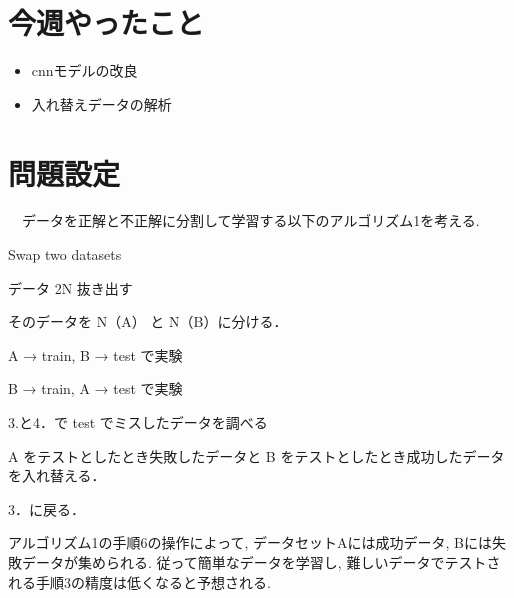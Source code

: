 \documentclass[twocolumn]{jarticle}     %
\begin{document}


\section{今週やったこと}
\begin{itemize}
	\item {cnnモデルの改良}
	\item {入れ替えデータの解析}
\end{itemize}

\section{問題設定}

　データを正解と不正解に分割して学習する以下のアルゴリズム1を考える.

	\begin{algorithm}
		\caption{Swap two datasets}
		\label{alg1}
		\begin{enumerate}{ %
			\item{データ 2N 抜き出す}
			\item{そのデータを N（A） と N（B）に分ける．}
			\item{A → train, B → test で実験}
			\item{B → train, A → test で実験}
			\item{3.と4．で test でミスしたデータを調べる}
			\item{A をテストとしたとき失敗したデータと B をテストとしたとき成功したデータを入れ替える．}
			\item{3．に戻る．}
		}\end{enumerate}
	\end{algorithm}

	アルゴリズム1の手順6の操作によって, データセットAには成功データ, Bには失敗データが集められる.
	従って簡単なデータを学習し, 難しいデータでテストされる手順3の精度は低くなると予想される.
\end{document}
